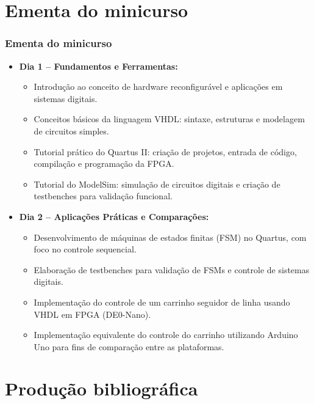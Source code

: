 \documentclass[aspectratio=169]{beamer}
\begin{document}
\section{Ementa do minicurso}
\begin{frame}
	\frametitle{Ementa do minicurso}
	
	
\begin{itemize}
	\item \textbf{Dia 1 – Fundamentos e Ferramentas:}
	\begin{itemize}
		\item Introdução ao conceito de hardware reconfigurável e aplicações em sistemas digitais.
		\item Conceitos básicos da linguagem VHDL: sintaxe, estruturas e modelagem de circuitos simples.
		\item Tutorial prático do Quartus II: criação de projetos, entrada de código, compilação e programação da FPGA.
		\item Tutorial do ModelSim: simulação de circuitos digitais e criação de testbenches para validação funcional.
	\end{itemize}
	
	\item \textbf{Dia 2 – Aplicações Práticas e Comparações:}
	\begin{itemize}
		\item Desenvolvimento de máquinas de estados finitas (FSM) no Quartus, com foco no controle sequencial.
		\item Elaboração de testbenches para validação de FSMs e controle de sistemas digitais.
		\item Implementação do controle de um carrinho seguidor de linha usando VHDL em FPGA (DE0-Nano).
		\item Implementação equivalente do controle do carrinho utilizando Arduino Uno para fins de comparação entre as plataformas.
	\end{itemize}
\end{itemize}

	
\end{frame}
\section{Produção bibliográfica}
\end{document}
